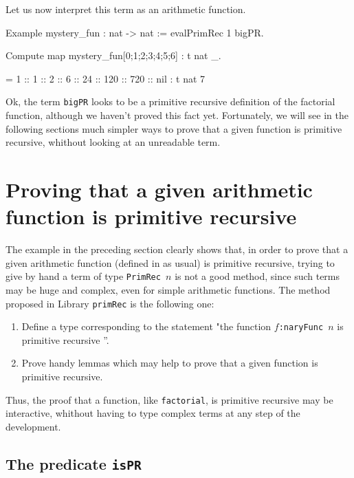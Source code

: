 Let us now interpret this term as an arithmetic function.

\begin{Coqsrc}
Example  mystery_fun : nat -> nat := evalPrimRec 1 bigPR.

Compute map mystery_fun[0;1;2;3;4;5;6] : t nat _.
\end{Coqsrc}

\begin{Coqanswer}
 = 1 :: 1 :: 2 :: 6 :: 24 :: 120 :: 720 :: nil
     : t nat 7
\end{Coqanswer}

Ok, the term \texttt{bigPR} looks to be a primitive recursive definition of the factorial function, although we haven't proved this fact yet. Fortunately, we will see in the following sections much simpler ways to prove that a given function is primitive recursive, whithout looking at an unreadable term.

\section{Proving that a given arithmetic function is primitive recursive}

The example in the preceding section clearly shows that, in order to prove that a given arithmetic function
(defined in \gallina{} as usual) is primitive recursive, trying to give  by hand a term  of type \texttt{PrimRec $n$} is not a good method, since such terms may be huge and complex, even for simple arithmetic functions. The method proposed in Library \texttt{primRec} is the following one:

\begin{enumerate}
\item Define a type corresponding to the statement "the function \texttt{$f$:naryFunc $n$} is primitive recursive ''.
\item Prove handy lemmas which may help to prove that a given function is primitive recursive.
\end{enumerate}

Thus, the proof that a function, like \texttt{factorial}, is primitive recursive may be interactive, whithout having to type complex terms at any step of the development.

\subsection{The predicate \texttt{isPR}}


